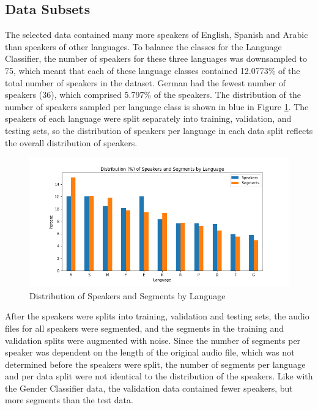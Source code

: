 \subsection{Data Subsets}
The selected data contained many more speakers of English, Spanish and Arabic than speakers of other languages. To balance the classes for the Language Classifier, the number of speakers for these three languages was downsampled to 75, which meant that each of these language classes contained 12.0773\% of the total number of speakers in the dataset. German had the fewest number of speakers (36), which comprised 5.797\% of the speakers. The distribution of the number of speakers sampled per language class is shown in blue in Figure \ref{fig:LangDistTot}. The speakers of each language were split separately into training, validation, and testing sets, so the distribution of speakers per language in each data split reflects the overall distribution of speakers.

\begin{figure}[h]
\begin{center}
\includegraphics[width=5in]{LangDistPercentSpSeg.png}
\caption{Distribution of Speakers and Segments by Language}
\label{fig:LangDistTot}
\end{center}
\end{figure}

After the speakers were splits into training, validation and testing sets, the audio files for all speakers were segmented, and the segments in the training and validation splits were augmented with noise. Since the number of segments per speaker was dependent on the length of the original audio file, which was not determined before the speakers were split, the number of segments per language and per data split were not identical to the distribution of the speakers. Like with the Gender Classifier data, the validation data contained fewer speakers, but more segments than the test data.

